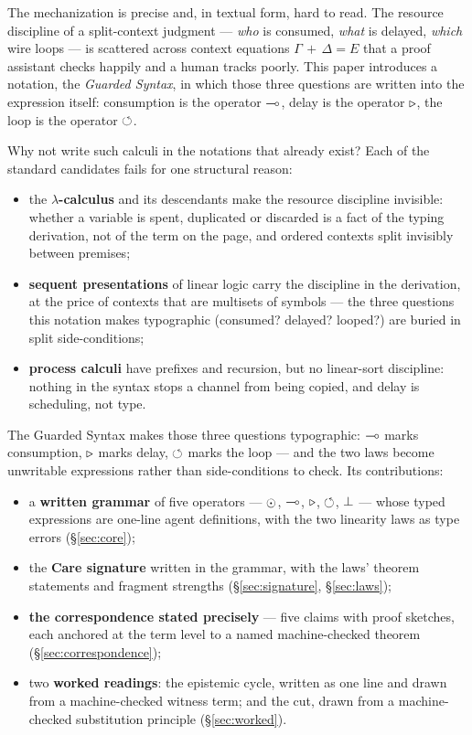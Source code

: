 \documentclass{eptcs}
\begin{document}
The mechanization is precise and, in textual form, hard to read. The
resource discipline of a split-context judgment --- \emph{who} is
consumed, \emph{what} is delayed, \emph{which} wire loops --- is scattered
across context equations $\Gamma\,{+}\,\Delta = E$ that a proof assistant
checks happily and a human tracks poorly. This paper introduces a
notation, the \emph{Guarded Syntax}, in which those three questions are
written into the expression itself: consumption is the operator
$\multimap$, delay is the operator $\triangleright$, the loop is the operator
$\circlearrowleft$.

Why not write such calculi in the notations that already exist? Each of
the standard candidates fails for one structural reason:

\begin{itemize}
\item the \textbf{$\lambda$-calculus} and its descendants make the
resource discipline invisible: whether a variable is spent, duplicated
or discarded is a fact of the typing derivation, not of the term on the
page, and ordered contexts split invisibly between premises;
\item \textbf{sequent presentations} of linear logic
\cite{girard1987} carry the discipline in the derivation, at the price
of contexts that are multisets of symbols --- the three questions this
notation makes typographic (consumed? delayed? looped?) are buried in
split side-conditions;
\item \textbf{process calculi} have prefixes and recursion, but no
linear-sort discipline: nothing in the syntax stops a channel from
being copied, and delay is scheduling, not type.
\end{itemize}

The Guarded Syntax makes those three questions typographic: $\multimap$
marks consumption, $\triangleright$ marks delay, $\circlearrowleft$ marks the loop --- and
the two laws become unwritable expressions rather than side-conditions
to check. Its contributions:

\begin{itemize}
\item a \textbf{written grammar} of five operators --- $\odot$,
$\multimap$, $\triangleright$, $\circlearrowleft$, $\bot$ --- whose typed expressions are
one-line agent definitions, with the two linearity laws as type errors
(\S\ref{sec:core});
\item the \textbf{Care signature} written in the grammar, with the laws'
theorem statements and fragment strengths (\S\ref{sec:signature},
\S\ref{sec:laws});
\item \textbf{the correspondence stated precisely} --- five claims with
proof sketches, each anchored at the term level to a named machine-checked
theorem (\S\ref{sec:correspondence});
\item two \textbf{worked readings}: the epistemic cycle, written as one
line and drawn from a machine-checked witness term; and the cut, drawn
from a machine-checked substitution principle (\S\ref{sec:worked}).
\end{itemize}
\end{document}

